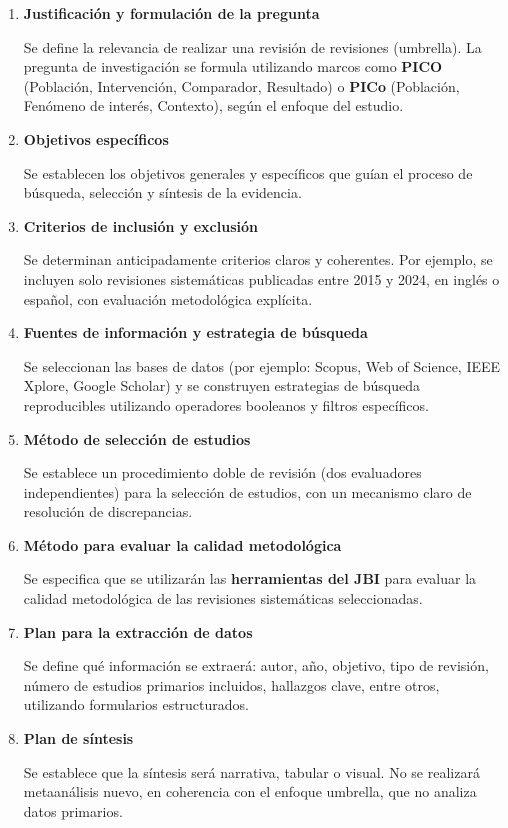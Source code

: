 \begin{enumerate}
    \item \textbf{Justificación y formulación de la pregunta}

    Se define la relevancia de realizar una revisión de revisiones (umbrella). La pregunta de investigación se formula utilizando marcos como \textbf{PICO} (Población, Intervención, Comparador, Resultado) o \textbf{PICo} (Población, Fenómeno de interés, Contexto), según el enfoque del estudio.

    \item \textbf{Objetivos específicos}

    Se establecen los objetivos generales y específicos que guían el proceso de búsqueda, selección y síntesis de la evidencia.

    \item \textbf{Criterios de inclusión y exclusión}

    Se determinan anticipadamente criterios claros y coherentes. Por ejemplo, se incluyen solo revisiones sistemáticas publicadas entre 2015 y 2024, en inglés o español, con evaluación metodológica explícita.

    \item \textbf{Fuentes de información y estrategia de búsqueda}

    Se seleccionan las bases de datos (por ejemplo: Scopus, Web of Science, IEEE Xplore, Google Scholar) y se construyen estrategias de búsqueda reproducibles utilizando operadores booleanos y filtros específicos.

    \item \textbf{Método de selección de estudios}

    Se establece un procedimiento doble de revisión (dos evaluadores independientes) para la selección de estudios, con un mecanismo claro de resolución de discrepancias.

    \item \textbf{Método para evaluar la calidad metodológica}

    Se especifica que se utilizarán las \textbf{herramientas del JBI} para evaluar la calidad metodológica de las revisiones sistemáticas seleccionadas.

    \item \textbf{Plan para la extracción de datos}

    Se define qué información se extraerá: autor, año, objetivo, tipo de revisión, número de estudios primarios incluidos, hallazgos clave, entre otros, utilizando formularios estructurados.

    \item \textbf{Plan de síntesis}

    Se establece que la síntesis será narrativa, tabular o visual. No se realizará metaanálisis nuevo, en coherencia con el enfoque umbrella, que no analiza datos primarios.
\end{enumerate}

